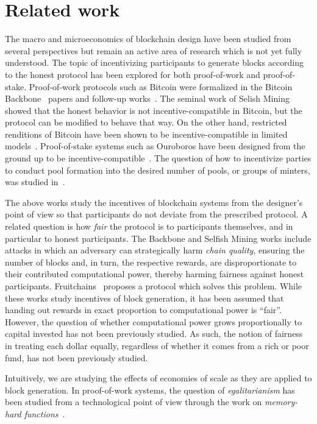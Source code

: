\section{Related work}\label{sec:related}
The macro and microeconomics of blockchain design have
been studied from several perspectives but remain an active area of research
which is not yet fully understood. The topic of incentivizing participants to
generate blocks according to the honest protocol has been explored for both
proof-of-work and proof-of-stake. Proof-of-work protocols such as Bitcoin were
formalized in the Bitcoin Backbone~\cite{EC:GarKiaLeo15,C:GarKiaLeo17} papers and
follow-up works~\cite{pass}. The seminal work of Selish Mining~\cite{selfish}
showed that the honest behavior is not incentive-compatible in Bitcoin, but the
protocol can be modified to behave that way. On the other hand, restricted
renditions of Bitcoin have been shown to be incentive-compatible in limited
models~\cite{tselekounis-kiayias}. Proof-of-stake systems such as Ouroboros
have been designed from the ground up to be
incentive-compatible~\cite{ouroboros}. The question of how to incentivize
parties to conduct pool formation into the desired number of pools, or groups of minters, was studied
in~\cite{stouka-koutsoupias-kiayias}.

The above works study the incentives of blockchain systems from the designer's
point of view so that participants do not deviate from the prescribed protocol.
A related question is how \emph{fair} the protocol is to participants
themselves, and in particular to honest participants. The Backbone and Selfish
Mining works include attacks in which an adversary can strategically harm
\emph{chain quality}, ensuring the number of blocks and, in turn, the respective
rewards, are disproportionate to their contributed computational power, thereby
harming fairness against honest participants. Fruitchains~\cite{fruitchains}
proposes a protocol which solves this problem.
While these works study incentives of block generation, it has been
assumed that handing out rewards in exact proportion to computational power is
``fair''. However, the question of whether computational power grows proportionally
to capital invested has not been previously studied. As such, the notion of
fairness in treating each dollar equally, regardless of whether it comes from a
rich or poor fund, has not been previously studied.

Intuitively, we are studying the effects of economies of scale as they are
applied to block generation.
In proof-of-work systems, the question of \emph{egalitarianism} has been studied
from a technological point of view through the work on \emph{memory-hard functions}~\cite{pebbling}.

